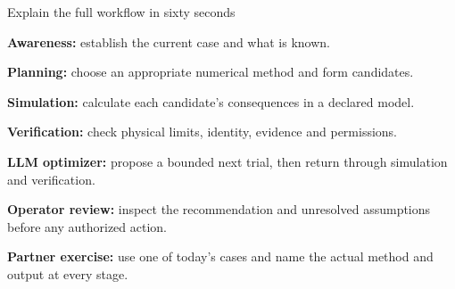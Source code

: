 \begin{frame}[t]{Explain the full workflow in sixty seconds}

\textbf{Awareness:} establish the current case and what is known.\par\medskip
\textbf{Planning:} choose an appropriate numerical method and form candidates.\par\medskip
\textbf{Simulation:} calculate each candidate's consequences in a declared model.\par\medskip
\textbf{Verification:} check physical limits, identity, evidence and permissions.\par\medskip
\textbf{LLM optimizer:} propose a bounded next trial, then return through simulation and verification.\par\medskip
\textbf{Operator review:} inspect the recommendation and unresolved assumptions before any authorized action.
\par\medskip
\textcolor{forest}{\textbf{Partner exercise:}} use one of today's cases and name the actual method and output at every stage.

\end{frame}

